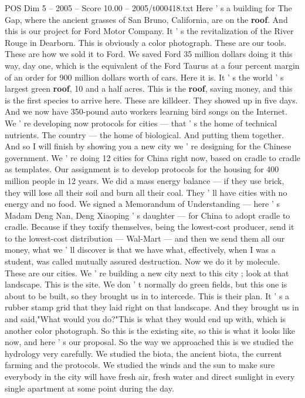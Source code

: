 \begin{textsample}{POS Dim 5 – 2005 – Score 10.00 – 2005/t000418.txt}
Here ' s a building for The Gap, where the ancient grasses of San Bruno, California, are on the \textbf{roof}.
And this is our project for Ford Motor Company.
It ' s the revitalization of the River Rouge in Dearborn.
This is obviously a color photograph.
These are our tools.
These are how we sold it to Ford.
We saved Ford 35 million dollars doing it this way, day one, which is the equivalent of the Ford Taurus at a four percent margin of an order for 900 million dollars worth of cars.
Here it is.
It ' s the world ' s largest green \textbf{roof}, 10 and a half acres.
This is the \textbf{roof}, saving money, and this is the first species to arrive here.
These are killdeer.
They showed up in five days.
And we now have 350-pound auto workers learning bird songs on the Internet.
We ' re developing now protocols for cities — that ' s the home of technical nutrients.
The country — the home of biological.
And putting them together.
And so I will finish by showing you a new city we ' re designing for the Chinese government.
We ' re doing 12 cities for China right now, based on cradle to cradle as templates.
Our assignment is to develop protocols for the housing for 400 million people in 12 years.
We did a mass energy balance — if they use brick, they will lose all their soil and burn all their coal.
They ' ll have cities with no energy and no food.
We signed a Memorandum of Understanding — here ' s Madam Deng Nan, Deng Xiaoping ' s daughter — for China to adopt cradle to cradle.
Because if they toxify themselves, being the lowest-cost producer, send it to the lowest-cost distribution — Wal-Mart — and then we send them all our money, what we ' ll discover is that we have what, effectively, when I was a student, was called mutually assured destruction.
Now we do it by molecule.
These are our cities.
We ' re building a new city next to this city ; look at that landscape.
This is the site.
We don ' t normally do green fields, but this one is about to be built, so they brought us in to intercede.
This is their plan.
It ' s a rubber stamp grid that they laid right on that landscape.
And they brought us in and said,"What would you do?"This is what they would end up with, which is another color photograph.
So this is the existing site, so this is what it looks like now, and here ' s our proposal.
So the way we approached this is we studied the hydrology very carefully.
We studied the biota, the ancient biota, the current farming and the protocols.
We studied the winds and the sun to make sure everybody in the city will have fresh air, fresh water and direct sunlight in every single apartment at some point during the day.

\end{textsample}
